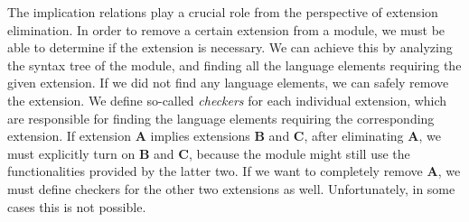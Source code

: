 \documentclass[main.tex]{subfiles}
\begin{document}
	The implication relations play a crucial role from the perspective of extension elimination. In order to remove a certain extension from a module, we must be able to determine if the extension is necessary. We can achieve this by analyzing the syntax tree of the module, and finding all the language elements requiring the given extension. If we did not find any language elements, we can safely remove the extension.	We define so-called \emph{checkers} for each individual extension, which are responsible for finding the language elements requiring the corresponding extension. If extension \textbf{A} implies extensions \textbf{B} and \textbf{C}, after eliminating \textbf{A}, we must explicitly turn on \textbf{B} and \textbf{C}, because the module might still use the functionalities provided by the latter two. If we want to completely remove \textbf{A}, we must define checkers for the other two extensions as well. Unfortunately, in some cases this is not possible.
	
	
	
\end{document}

